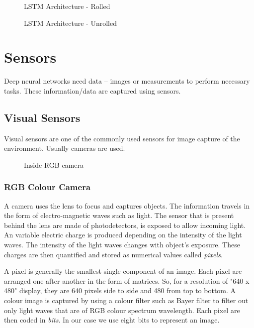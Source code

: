 \begin{figure}[!ht]
    \centering
	   \def\svgwidth{0.7\textwidth}
    \caption{LSTM Architecture - Rolled}
    \label{fig:lstm}
\end{figure}

\begin{figure}[!ht]
    \centering
        \def\svgwidth{1.0\textwidth}
    \caption{LSTM Architecture - Unrolled}
    \label{fig:lstmunrolled}
\end{figure}
\newpage
\section{Sensors}
Deep neural networks need data -- images or measurements to perform necessary tasks. These
information/data are captured using sensors.
\subsection{Visual Sensors}
Visual sensors are one of the commonly used sensors for image capture of the environment.
Usually cameras are used.
\begin{figure}[!ht]
	\centering
    \def\svgwidth{0.6\textwidth}
    \caption{Inside RGB camera}
    \label{fig:rgbcamera}
\end{figure}

\subsubsection*{RGB Colour Camera}
A camera uses the lens to focus and captures objects. The information travels in the form of electro-magnetic waves such as light. The sensor
that is present behind the lens are made of photodetectors, is exposed to allow incoming
light. An variable electric charge is produced depending on the intensity of the light
waves. The intensity of the light waves changes with object's exposure. These charges are then quantified and stored as numerical values called
\textit{pixels}.

A pixel is generally the smallest single component of an image. Each pixel are arranged
one after another in the form of matrices. So, for a resolution of "640 x 480" display,
they are 640 pixels side to side and 480 from top to bottom.
A colour image is captured by using a colour filter such as Bayer filter to filter out
only light waves that are of RGB colour spectrum wavelength. Each pixel are then coded
in \textit{bits}. In our case we use eight bits to represent an image.


